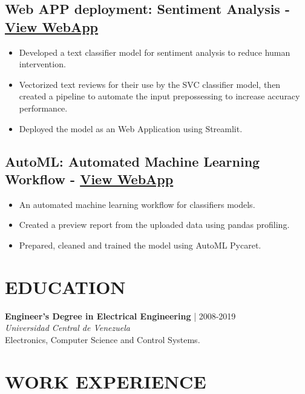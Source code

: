 \documentclass[5pt]{article} %
\def\ucv{Universidad Central de Venezuela}
\begin{document}
\subsection*{Web APP deployment: Sentiment Analysis - \href{https://dquerales-webapp-app-xmgqcu.streamlit.app/}{View WebApp}}
 
\begin{itemize}
\itemsep0em
\item Developed a text classifier model for sentiment analysis to reduce human intervention.
\item Vectorized text reviews for their use by the SVC classifier model, then created a pipeline to automate the input prepossessing to increase accuracy performance.
\item Deployed the model as an Web Application using Streamlit.
\end{itemize}

\subsection*{AutoML: Automated Machine Learning Workflow - \href{https://dquerales-automl-app-c70cuz.streamlit.app/}{View WebApp}}
 
\begin{itemize}
\itemsep0em
\item An automated machine learning workflow for classifiers models.
\item Created a preview report from the uploaded data using pandas profiling.
\item Prepared, cleaned and trained the model using AutoML Pycaret.
\end{itemize}



\section*{EDUCATION}

\textbf{Engineer's Degree in Electrical Engineering} | 2008-2019 \\ 
\emph{\ucv}\\
Electronics, Computer Science and Control Systems.

\section*{WORK EXPERIENCE}
\end{document}

